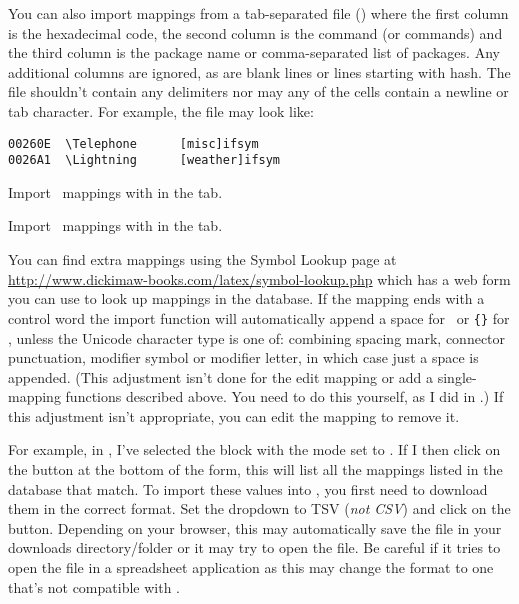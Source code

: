 You can also import mappings from a tab-separated file ()
where the first column is the hexadecimal code, the second column is
the command (or commands) and the third column is the package name
or comma-separated list of packages. Any additional columns are
ignored, as are blank lines or lines starting with \gls{hash}. The file
shouldn't contain any delimiters nor may any of
the cells contain a newline or tab character. For example,
the file may look like:
\begin{verbatim}
00260E  \Telephone      [misc]ifsym
0026A1  \Lightning      [weather]ifsym
\end{verbatim}

Import \textmode\ mappings with 
in the  tab.

Import \mathsmode\ mappings with 
in the  tab.

You can find extra mappings using the Symbol Lookup page at
\url{http://www.dickimaw-books.com/latex/symbol-lookup.php} which
has a web form you can use to look up mappings in the database.  If
the mapping ends with a control word the import function will
automatically append a space for \mathsmode\ or
\verb|{}| for \textmode, unless the Unicode character type is one
of: combining spacing mark, connector punctuation, modifier symbol
or modifier letter, in which case just a space is appended.
(This adjustment isn't done for the edit mapping or
add a single-mapping functions described above. You need to do this
yourself, as I did in .) If this
adjustment isn't appropriate, you can edit the mapping to remove it.

For example, in , I've selected the
 block with the mode set to . If I
then click on the  button at the bottom of the form, this
will list all the mappings listed in the database that match. To
import these values into \FlowframTk, you first need to download
them in the correct format. Set the 
\gls{dropdown} to TSV (\emph{not CSV}) and click on the
 button. Depending on your browser, this may
automatically save the file  in your
downloads directory\slash folder or it may try to open the file.
Be careful if it tries to open the file in a spreadsheet application
as this may change the format to one that's not compatible with
\FlowframTk.

